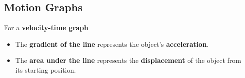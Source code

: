 \subsection{Motion Graphs}

For a \textbf{velocity-time graph}
\begin{itemize}
    \item The \textbf{gradient of the line} represents the object's \textbf{acceleration}.
    \item The \textbf{area under the line} represents the \textbf{displacement} of the object from its starting position.
\end{itemize}
